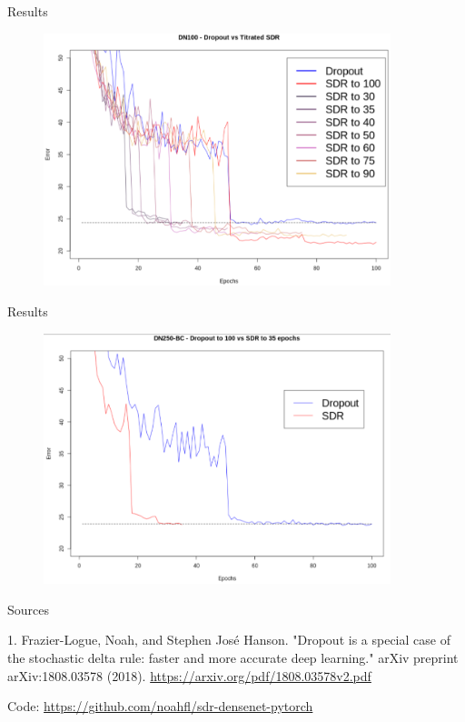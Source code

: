 \documentclass{beamer}
\begin{document}
\begin{frame}{Results}
\begin{figure}[h]
\includegraphics[width=0.9\textwidth]{img/titrated}
\end{figure}
\end{frame}
\begin{frame}{Results}
\begin{figure}[h]
\includegraphics[width=0.9\textwidth]{img/dropout_vs_sdr}
\end{figure}
\end{frame}


\begin{frame}{Sources}

\begin{thebibliography}{0}

   1. Frazier-Logue, Noah, and Stephen José Hanson. "Dropout is a special case of the stochastic delta rule: faster and more accurate deep learning." arXiv preprint arXiv:1808.03578 (2018). \url{https://arxiv.org/pdf/1808.03578v2.pdf} 
  
  Code: \url{https://github.com/noahfl/sdr-densenet-pytorch}
  
\end{thebibliography}

\end{frame}

 
 
 
\end{document}
